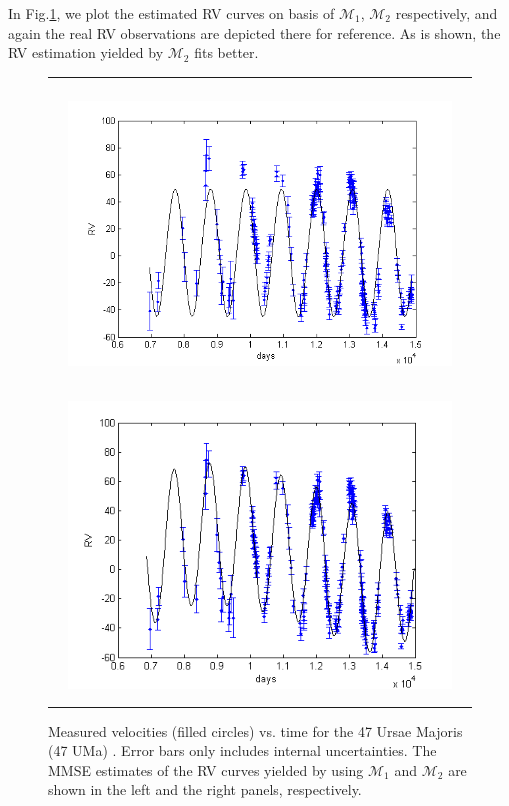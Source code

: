 In Fig.\ref{fig:uma47_fit}, we plot the estimated RV curves on basis
of $\mathcal{M}_1$, $\mathcal{M}_2$ respectively, and again the real
RV observations are depicted there for reference. As is shown, the
RV estimation yielded by $\mathcal{M}_2$ fits better.

\begin{figure}[!htb]
\begin{tabular}{c}
\centerline{\includegraphics[width=4in,height=3.2in]{Fig/uma47_1p_fit.png}\includegraphics[width=4in,height=3.2in]{Fig/uma47_2p_fit.png}}
\end{tabular}
\caption{Measured velocities (filled circles) vs. time for the 47
Ursae Majoris (47 UMa) \citep{gregory2010bayesian}. Error bars only
includes internal uncertainties. The MMSE estimates of the RV curves
yielded by using $\mathcal{M}_1$ and $\mathcal{M}_2$ are shown in
the left and the right panels, respectively.} \label{fig:uma47_fit}
\end{figure}

